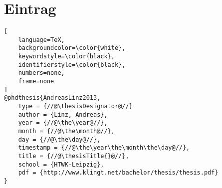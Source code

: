 \chapter*{\BibTeX{} Eintrag}

\begin{lstlisting}[
	language=TeX,
	backgroundcolor=\color{white},
	keywordstyle=\color{black},
	identifierstyle=\color{black},
	numbers=none,
	frame=none
]
@phdthesis{AndreasLinz2013,
	type = {//@\thesisDesignator@//}
	author = {Linz, Andreas},
	year = {//@\the\year@//},
	month = {//@\the\month@//},
	day = {//@\the\day@//},
	timestamp = {//@\the\year\the\month\the\day@//},
	title = {//@\thesisTitle{}@//},
	school = {HTWK-Leipzig},
	pdf = {http://www.klingt.net/bachelor/thesis/thesis.pdf}
}
\end{lstlisting}
